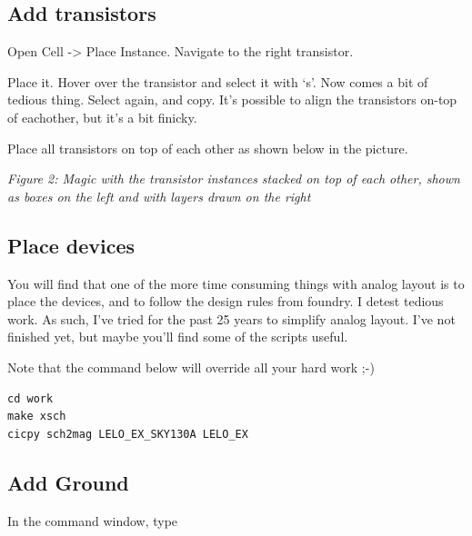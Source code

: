\subsection{Add transistors}\label{add-transistors-1}

Open Cell -\textgreater{} Place Instance. Navigate to the right
transistor.

Place it. Hover over the transistor and select it with `s'. Now comes a
bit of tedious thing. Select again, and copy. It's possible to align the
transistors on-top of eachother, but it's a bit finicky.

Place all transistors on top of each other as shown below in the
picture.


{
\centering
{}
}

\emph{Figure 2: Magic with the transistor instances stacked on top of
each other, shown as boxes on the left and with layers drawn on the
right}

\subsection{Place devices}\label{place-devices}

You will find that one of the more time consuming things with analog
layout is to place the devices, and to follow the design rules from
foundry. I detest tedious work. As such, I've tried for the past 25
years to simplify analog layout. I've not finished yet, but maybe you'll
find some of the scripts useful.

Note that the command below will override all your hard work ;-)

\begin{verbatim}
cd work
make xsch
cicpy sch2mag LELO_EX_SKY130A LELO_EX
\end{verbatim}

\subsection{Add Ground}\label{add-ground}

In the command window, type

\begin{Shaded}
\begin{Highlighting}[]
\end{Highlighting}
\end{Shaded}

